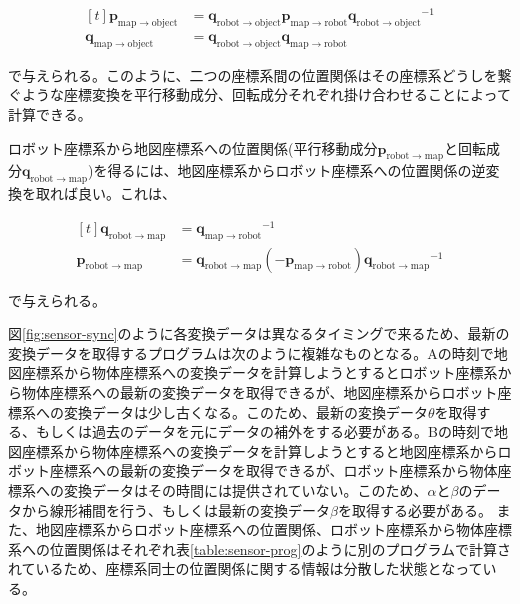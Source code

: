 \documentclass[a4paper]{jreport}	%
\begin{document}
\begin{equation}
\begin{aligned}[t]
	\mathbf{p}_{\mathrm{map \rightarrow object}} &= 
	\mathbf{q}_{\mathrm{robot \rightarrow object}}
	\mathbf{p}_{\mathrm{map \rightarrow robot}}
	{\mathbf{q}_{\mathrm{robot \rightarrow object}}}^{-1} \\
	\mathbf{q}_{\mathrm{map \rightarrow object}} &= \mathbf{q}_{\mathrm{robot \rightarrow object}} 
	\mathbf{q}_{\mathrm{map \rightarrow  robot}}
\end{aligned}
\label{equation:cross}
\end{equation}

で与えられる。このように、二つの座標系間の位置関係はその座標系どうしを繋ぐような座標変換を平行移動成分、回転成分それぞれ掛け合わせることによって計算できる。

ロボット座標系から地図座標系への位置関係(平行移動成分$\mathbf{p}_{\mathrm{robot \rightarrow map}}$と回転成分$\mathbf{q}_{\mathrm{robot \rightarrow map}}$)を得るには、地図座標系からロボット座標系への位置関係の逆変換を取れば良い。これは、

\begin{equation}
\begin{aligned}[t]
	\mathbf{q}_{\mathrm{robot \rightarrow map}} &= {\mathbf{q}_{\mathrm{map \rightarrow robot}}}^{-1}
	\\
	\mathbf{p}_{\mathrm{robot \rightarrow map}} &= \mathbf{q}_{\mathrm{robot \rightarrow map}}(-\mathbf{p}_{\mathrm{map \rightarrow robot}}){\mathbf{q}_{\mathrm{robot \rightarrow map}}}^{-1}
\end{aligned}
\label{equation:inv}
\end{equation}

で与えられる。


図\ref{fig:sensor-sync}のように各変換データは異なるタイミングで来るため、最新の変換データを取得するプログラムは次のように複雑なものとなる。Aの時刻で地図座標系から物体座標系への変換データを計算しようとするとロボット座標系から物体座標系への最新の変換データを取得できるが、地図座標系からロボット座標系への変換データは少し古くなる。このため、最新の変換データ$\theta$を取得する、もしくは過去のデータを元にデータの補外をする必要がある。Bの時刻で地図座標系から物体座標系への変換データを計算しようとすると地図座標系からロボット座標系への最新の変換データを取得できるが、ロボット座標系から物体座標系への変換データはその時間には提供されていない。このため、$\alpha$と$\beta$のデータから線形補間を行う、もしくは最新の変換データ$\beta$を取得する必要がある。
また、地図座標系からロボット座標系への位置関係、ロボット座標系から物体座標系への位置関係はそれぞれ表\ref{table:sensor-prog}のように別のプログラムで計算されているため、座標系同士の位置関係に関する情報は分散した状態となっている。
\end{document}
